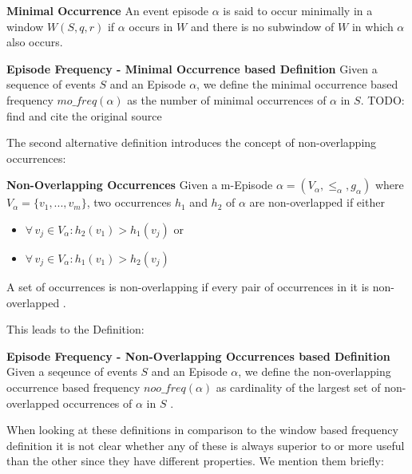 \begin{mydef}
\textbf{Minimal Occurrence} An event episode $\alpha$ is said to occur minimally in a window $W(S,q,r)$ if $\alpha$ occurs in $W$ and there is no subwindow of $W$ in which $\alpha$ also occurs. %
\end{mydef}

\begin{mydef}
\textbf{Episode Frequency - Minimal Occurrence based Definition} Given a sequence of events $S$ and an Episode $\alpha$, we define the minimal occurrence based frequency $mo\_freq(\alpha )$ as the number of minimal occurrences of $\alpha$ in $S$. TODO: find and cite the original source
\end{mydef}

The second alternative definition introduces the concept of non-overlapping occurrences:

\begin{mydef}
\textbf{Non-Overlapping Occurrences} Given a m-Episode $\alpha = (V_\alpha,{\leq}_{\alpha},g_\alpha)$ where $V_\alpha = \{v_1,...,v_m\}$, two occurrences $h_1$ and $h_2$ of $\alpha$ are non-overlapped if either 
\begin{itemize}
	\item $\forall \, v_j \in V_\alpha : h_2(v_1)>h_1(v_j)$ or 
	\item $\forall \, v_j \in V_\alpha : h_1(v_1)>h_2(v_j)$
\end{itemize}
A set of occurrences is non-overlapping if every pair of occurrences in it is non-overlapped \cite{laxman2007fast}.
\end{mydef}

This leads to the Definition:

\begin{mydef}
\textbf{Episode Frequency - Non-Overlapping Occurrences based Definition} Given a seqeunce of events $S$ and an Episode $\alpha$, we define the non-overlapping occurrence based frequency $noo\_freq(\alpha )$ as cardinality of the largest set of non-overlapped occurrences of $\alpha$ in $S$ \cite{laxman2007fast}.
\end{mydef}

When looking at these definitions in comparison to the window based frequency definition it is not clear whether any of these is always superior to or more useful than the other since they have different properties. We mention them briefly:

